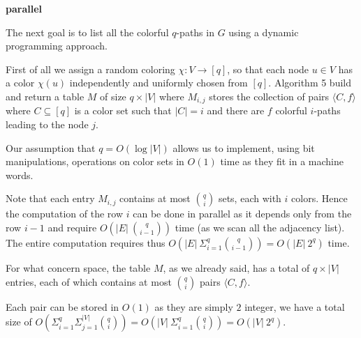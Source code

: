\begin{algorithm}[h]
		
	\small
	\DontPrintSemicolon
	\BlankLine
	\textbf{parallel} 
	\BlankLine
	\caption{$\textsc{preprocess}$: $\textsc{color-coding}$}
	\label{alg:color-coding}
\end{algorithm}

The next goal is to list all the colorful $q$-paths in $G$ using a dynamic programming approach.\medskip

First of all we assign a random coloring $\chi : V \rightarrow [q]$, so that each node $u \in V$ has a color $\chi(u)$ independently and uniformly chosen from $[q]$. Algorithm 5 build and return a table $M$ of size $q \times |V|$ where $M_{i,j}$ stores the collection of pairs $\langle C, f \rangle$ where  $C \subseteq [q]$ is a color set such that $|C| = i$ and there are $f$ colorful $i$-paths leading to the node $j$.\medskip

Our assumption that $q = O(\log |V|)$ allows us to implement, using bit manipulations, operations on color sets in $O(1)$ time as they fit in a machine words.\medskip

Note that each entry $M_{i, j}$ contains at most $\binom{q}{i}$ sets, each with $i$ colors. Hence the computation of the row $i$ can be done in parallel as it depends only from the row $i-1$ and require $O(|E|\ \binom{q}{i-1})$ time (as we scan all the adjacency list). The entire computation requires thus $O(|E|\ \Sigma_{i=1}^{q}{\binom{q}{i-1}}) = O(|E|\ 2^{q})$ time.\bigskip

For what concern space, the table $M$, as we already said, has a total of $q \times |V|$ entries, each of which contains at most $\binom{q}{i}$ pairs $\langle C, f \rangle$.

Each pair can be stored in $O(1)$ as they are simply $2$ integer, we have a total size of $O(\Sigma_{i=1}^{q}{\Sigma_{j=1}^{|V|}{ \binom{q}{i}}}) = O(|V|\ \Sigma_{i=1}^{q}{\binom{q}{i}}) = O(|V|\ 2^{q})$.\bigskip

